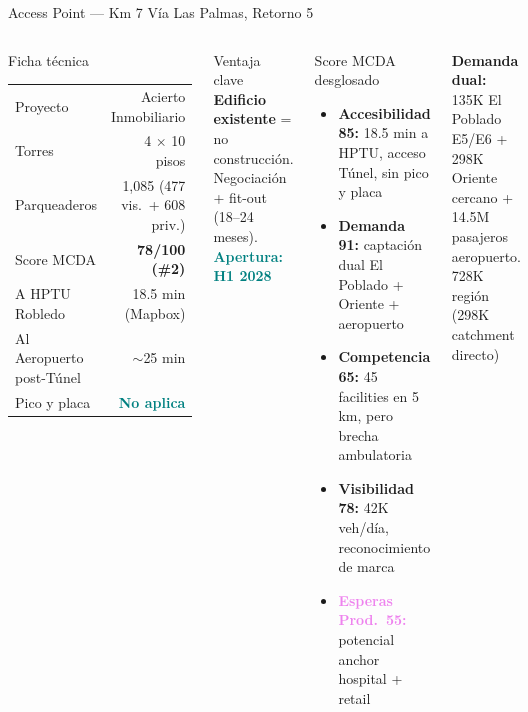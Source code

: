 \documentclass[aspectratio=169, 11pt]{beamer}
\newcommand{\highlight}[1]{\textcolor{teal}{\textbf{#1}}}
\begin{document}
\begin{frame}{Access Point --- Km 7 Vía Las Palmas, Retorno 5}
\begin{columns}[T]
\begin{block}{\small Ficha técnica}
\scriptsize
\begin{tabular}{@{}lr@{}}
\toprule
Proyecto & Acierto Inmobiliario \\
Torres & 4 $\times$ 10 pisos \\
Parqueaderos & 1,085 (477 vis.\ + 608 priv.) \\
Score MCDA & \textcolor{rose}{\textbf{78/100 (\#2)}} \\
A HPTU Robledo & 18.5 min (Mapbox) \\
Al Aeropuerto post-Túnel & $\sim$25 min \\
Pico y placa & \highlight{No aplica} \\
\bottomrule
\end{tabular}
\end{block}

\vspace{2pt}
\begin{alertblock}{\small Ventaja clave}
\centering\scriptsize
\textbf{Edificio existente} = no construcción.
Negociación + fit-out (18--24 meses). \highlight{Apertura: H1 2028}
\end{alertblock}

\begin{exampleblock}{\small Score MCDA desglosado}
\scriptsize
\begin{itemize}\setlength{\itemsep}{1pt}
  \item \textbf{Accesibilidad 85:} 18.5 min a HPTU, acceso Túnel, sin pico y placa
  \item \textbf{Demanda 91:} captación dual El Poblado + Oriente + aeropuerto
  \item \textbf{Competencia 65:} 45 facilities en 5 km, pero brecha ambulatoria
  \item \textcolor{rose}{\textbf{Visibilidad 78:}} 42K veh/día, reconocimiento de marca
  \item \textcolor{violet}{\textbf{Esperas Prod.\ 55:}} potencial anchor hospital + retail
\end{itemize}
\end{exampleblock}

\vspace{1pt}
{\tiny\textbf{Demanda dual:} 135K El Poblado E5/E6 + 298K Oriente cercano + 14.5M pasajeros aeropuerto. 728K región (298K catchment directo)}
\end{columns}
\end{frame}
\end{document}
